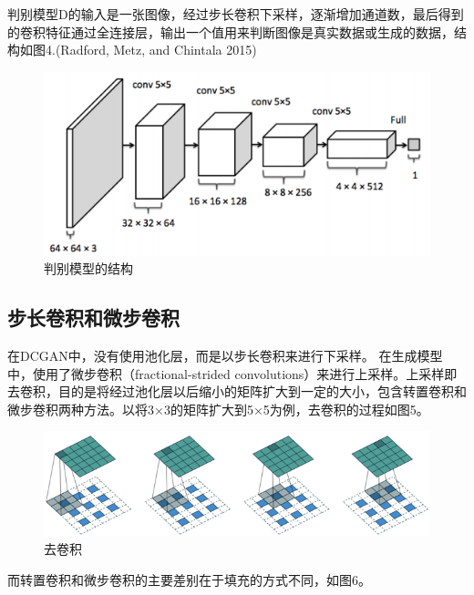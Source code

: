 \documentclass[
  hyperref, a4paper]{ctexart}
\begin{document}
判别模型D的输入是一张图像，经过步长卷积下采样，逐渐增加通道数，最后得到的卷积特征通过全连接层，输出一个值用来判断图像是真实数据或生成的数据，结构如图4.(Radford,
Metz, and Chintala 2015)

\begin{figure}
\centering
\includegraphics{4.png}
\caption{判别模型的结构}
\end{figure}

\hypertarget{ux6b65ux957fux5377ux79efux548cux5faeux6b65ux5377ux79ef}{%
\subsection{步长卷积和微步卷积}\label{ux6b65ux957fux5377ux79efux548cux5faeux6b65ux5377ux79ef}}

在DCGAN中，没有使用池化层，而是以步长卷积来进行下采样。
在生成模型中，使用了微步卷积（fractional-strided
convolutions）来进行上采样。上采样即去卷积，目的是将经过池化层以后缩小的矩阵扩大到一定的大小，包含转置卷积和微步卷积两种方法。以将3×3的矩阵扩大到5×5为例，去卷积的过程如图5。

\begin{figure}
\centering
\includegraphics{./5.png}
\caption{去卷积}
\end{figure}

而转置卷积和微步卷积的主要差别在于填充的方式不同，如图6。
\end{document}
